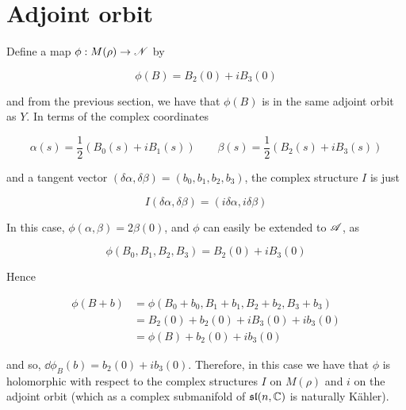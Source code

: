 \documentclass{report}
\renewcommand{\sl}{\mathfrak{sl}}
\begin{document}
\section{Adjoint orbit}

Define a map \(\phi : M(\rho) \to \mathscr{N}\) by

\[\phi(B) = B_2(0) + iB_3(0)\]

and from the previous section, we have that \(\phi(B)\) is in the same adjoint orbit as \(Y\). In terms of the complex coordinates

\[\alpha(s) = \frac12(B_0(s) + iB_1(s)) \qquad \beta(s) = \frac12(B_2(s) + iB_3(s))\]

and a tangent vector \((\delta\alpha, \delta\beta) = (b_0, b_1, b_2, b_3)\), the complex structure \(I\) is just

\[I(\delta\alpha, \delta\beta) = (i\delta\alpha, i\delta\beta)\]

In this case, \(\phi(\alpha, \beta) = 2\beta(0)\), and \(\phi\) can easily be extended to \(\mathscr{A}\), as

\[\phi(B_0, B_1, B_2, B_3) = B_2(0) + iB_3(0)\]

Hence

\begin{align*}
    \phi(B + b) &= \phi(B_0 + b_0, B_1 + b_1, B_2 + b_2, B_3 + b_3) \\
    &= B_2(0) + b_2(0) + iB_3(0) + ib_3(0) \\
    &= \phi(B) + b_2(0) + ib_3(0) 
\end{align*}

and so, \(\dd\phi_B(b) = b_2(0) + ib_3(0)\). Therefore, in this case we have that \(\phi\) is holomorphic with respect to the complex structures \(I\) on \(M(\rho)\) and \(i\) on the adjoint orbit (which as a complex submanifold of \(\sl(n, \C)\) is naturally K\"ahler).





\printbibliography
\end{document}
